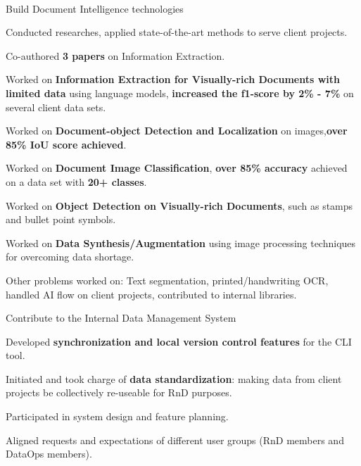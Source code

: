 \\
\begin{xitemize}
    \item Build Document Intelligence technologies
    \begin{zitemize}
        \item Conducted researches, applied state-of-the-art methods to serve client projects.
        \item Co-authored \textbf{3 papers} on Information Extraction.
        \item Worked on \textbf{Information Extraction for Visually-rich Documents with limited data} using language models, \textbf{increased the f1-score by 2\%  - 7\%} on several client data sets.
        \item Worked on \textbf{Document-object Detection and Localization} on images,\textbf{over 85\% IoU score achieved}.
        \item Worked on \textbf{Document Image Classification}, \textbf{over 85\% accuracy} achieved on a data set with \textbf{20+ classes}.
        \item Worked on \textbf{Object Detection on Visually-rich Documents}, such as stamps and bullet point symbols.
        \item Worked on \textbf{Data Synthesis/Augmentation} using image processing techniques for overcoming data shortage.
        \item Other problems worked on: Text segmentation, printed/handwriting OCR, handled AI flow on client projects, contributed to internal libraries.
    \end{zitemize}
    \item Contribute to the Internal Data Management System
    \begin{zitemize}
        \item Developed \textbf{synchronization and local version control features} for the CLI tool.
        \item Initiated and took charge of \textbf{data standardization}: making data from client projects be collectively re-useable for RnD purposes.
        \item Participated in system design and feature planning.
        \item Aligned requests and expectations of different user groups (RnD members and DataOps members).
    \end{zitemize}

\end{xitemize}

